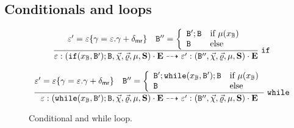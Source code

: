 \subsection{Conditionals and loops}

\begin{figure}[ht]
$$
\begin{array}{c}
\dfrac{
\varepsilon'=\varepsilon\{\gamma=\varepsilon.\gamma+\delta_{\mathsf{mr}}\} \quad
\mathtt{B}'' = \left\{\begin{array}{ll}
\mathtt{B}';\mathtt{B} &\hbox{if}\ \mu(x_{\mathbb{B}}) \\
\mathtt{B} &\hbox{else}
\end{array}\right.
} 
{
\varepsilon:(\mathtt{if}(x_{\mathbb{B}},\mathtt{B}');\mathtt{B},\vec{\chi},\vec{\varrho}, \mu, \mathbf{S})\cdot\mathbf{E} \dashrightarrow\varepsilon':(\mathtt{B}'',\vec{\chi}, \vec{\varrho}, \mu, \mathbf{S})\cdot\mathbf{E}
}\;\mathtt{if}
\\\\
\dfrac{
\varepsilon'=\varepsilon\{\gamma=\varepsilon.\gamma+\delta_{\mathsf{mr}}\} 
\quad \mathtt{B}'' = \left\{\begin{array}{ll}
\mathtt{B}';\mathtt{while}(x_{\mathbb{B}},\mathtt{B}');\mathtt{B} &\hbox{if}\ \mu(x_{\mathbb{B}}) \\
\mathtt{B} &\hbox{else}
\end{array}\right.} 
{
\varepsilon:(\mathtt{while}(x_{\mathbb{B}},\mathtt{B}');\mathtt{B},\vec{\chi},\vec{\varrho},\mu, \mathbf{S})\cdot\mathbf{E} \dashrightarrow\varepsilon':(\mathtt{B}'', \vec{\chi},\vec{\varrho}, \mu, \mathbf{S})\cdot\mathbf{E}
}\;\mathtt{while} 
\end{array}
$$
\caption{Conditional and while loop.}
\end{figure}
